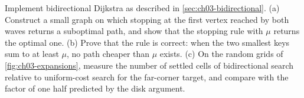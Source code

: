\begin{exercise}[\difficulty{3}]
\label{exr:ch03-bidirectional}
Implement bidirectional Dijkstra as described in \cref{sec:ch03-bidirectional}. (a) Construct a
small graph on which stopping at the first vertex reached by both waves returns a suboptimal
path, and show that the stopping rule with $\mu$ returns the optimal one. (b) Prove that the
rule is correct: when the two smallest keys sum to at least $\mu$, no path cheaper than $\mu$
exists. (c) On the random grids of \cref{fig:ch03-expansions}, measure the number of settled
cells of bidirectional search relative to uniform-cost search for the far-corner target, and
compare with the factor of one half predicted by the disk argument.
\end{exercise}

